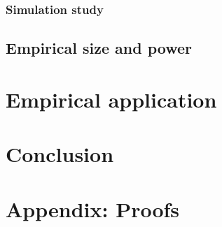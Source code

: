 \documentclass[harvard,11pt]{article}
\begin{document}
\subsubsection{Simulation study \label{Simulation study}}

\subsection{Empirical size and power \label{Empirical size and power}}

\section{Empirical application\label{Empirical application}}


\section{Conclusion \label{Conclusion}}

\newpage



\newpage

\section{Appendix: Proofs \label{Appendix: Proofs}}
\end{document}
